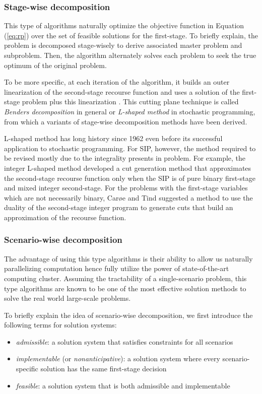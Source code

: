 \subsubsection{Stage-wise decomposition}
This type of algorithms naturally optimize the objective function in Equation (\ref{eq:rp}) over the set of feasible solutions for the first-stage. To briefly explain, the problem is decomposed stage-wisely to derive associated master problem and subproblem. Then, the algorithm alternately solves each problem to seek the true optimum of the original problem.
 
To be more specific, at each iteration of the algorithm, it builds an outer linearization of the second-stage recourse function and uses a solution of the first-stage problem plus this linearization \cite{book:BL2011}. This cutting plane technique is called \textit{Benders decomposition} \cite{journal:B1962} in general or \textit{L-shaped method} in stochastic programming, from which a variants of stage-wise decomposition methods have been derived. 

L-shaped method has long history since 1962 even before its successful application to stochastic programming. For SIP, however, the method required to be revised mostly due to the integrality presents in problem. For example, the integer L-shaped method \cite{journal:LL1993} developed a cut generation method that approximates the second-stage recourse function only when the SIP is of pure binary first-stage and mixed integer second-stage. For the problems with the first-stage variables which are not necessarily binary, Car{\o}e and Tind \cite{journal:CT1998} suggested a method to use the duality of the second-stage integer program to generate cuts that build an approximation of the recourse function.

\subsubsection{Scenario-wise decomposition}
The advantage of using this type algorithms is their ability to allow us naturally parallelizing computation hence fully utilize the power of state-of-the-art computing cluster. Assuming the tractability of a single-scenario problem, this type algorithms are known to be one of the most effective solution methods to solve the real world large-scale problems.

To briefly explain the idea of scenario-wise decomposition, we first introduce the following terms for solution systems:
\begin{itemize}
	\item \textit{admissible}: a solution system that satisfies constraints for all scenarios
	\item \textit{implementable} (or \textit{nonanticipative}): a solution system where every scenario-specific solution has the same first-stage decision
	\item \textit{feasible}: a solution system that is both admissible and implementable
\end{itemize}

